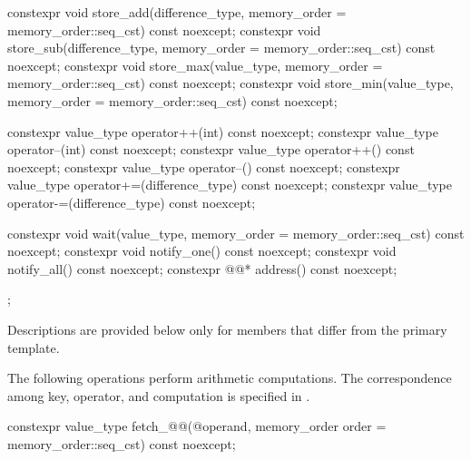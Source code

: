 \begin{codeblock}
{{    constexpr void store_add(difference_type,
                             memory_order = memory_order::seq_cst) const noexcept;
    constexpr void store_sub(difference_type,
                             memory_order = memory_order::seq_cst) const noexcept;
    constexpr void store_max(value_type,
                             memory_order = memory_order::seq_cst) const noexcept;
    constexpr void store_min(value_type,
                             memory_order = memory_order::seq_cst) const noexcept;

    constexpr value_type operator++(int) const noexcept;
    constexpr value_type operator--(int) const noexcept;
    constexpr value_type operator++() const noexcept;
    constexpr value_type operator--() const noexcept;
    constexpr value_type operator+=(difference_type) const noexcept;
    constexpr value_type operator-=(difference_type) const noexcept;

    constexpr void wait(value_type, memory_order = memory_order::seq_cst) const noexcept;
    constexpr void notify_one() const noexcept;
    constexpr void notify_all() const noexcept;
    constexpr @@* address() const noexcept;
  };
}
\end{codeblock}

\pnum
Descriptions are provided below only for members
that differ from the primary template.

\pnum
The following operations perform arithmetic computations.
The correspondence among key, operator, and computation is specified
in .

%
%
%
%
\begin{itemdecl}
constexpr value_type fetch_@@(@\seeabovenc@ operand,
                               memory_order order = memory_order::seq_cst) const noexcept;
\end{itemdecl}

